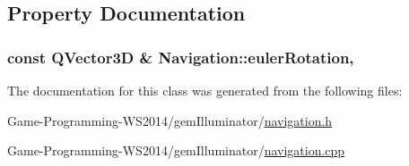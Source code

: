 \subsection{Property Documentation}
\hypertarget{class_navigation_a34c974ef7c98cf9853a4ac62ab42ac2f}{}
\subsubsection[{euler\+Rotation}]{\setlength{\rightskip}{0pt plus 5cm}const Q\+Vector3\+D \& Navigation\+::euler\+Rotation\hspace{0.3cm}{\ttfamily [read]}, {\ttfamily [write]}}\label{class_navigation_a34c974ef7c98cf9853a4ac62ab42ac2f}


The documentation for this class was generated from the following files\+:\begin{DoxyCompactItemize}
\item 
Game-\/\+Programming-\/\+W\+S2014/gem\+Illuminator/\hyperlink{navigation_8h}{navigation.\+h}\item 
Game-\/\+Programming-\/\+W\+S2014/gem\+Illuminator/\hyperlink{navigation_8cpp}{navigation.\+cpp}\end{DoxyCompactItemize}
